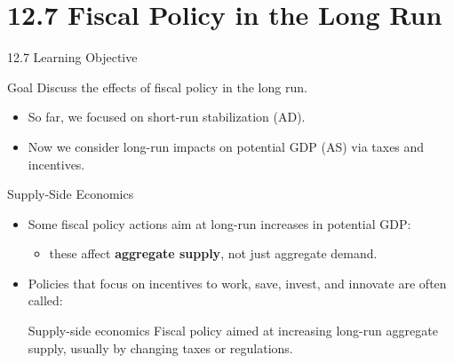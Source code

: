 \documentclass[aspectratio=169]{beamer}
\begin{document}
\section{12.7 Fiscal Policy in the Long Run}

\begin{frame}{12.7 Learning Objective}
\transfade
\begin{block}{Goal}
Discuss the effects of fiscal policy in the long run.
\end{block}
\begin{itemize}[<+->]
  \item So far, we focused on short-run stabilization (AD).
  \item Now we consider long-run impacts on potential GDP (AS) via taxes and incentives.
\end{itemize}
\end{frame}

\begin{frame}{Supply-Side Economics}
\transfade
\begin{itemize}[<+->]
  \item Some fiscal policy actions aim at long-run increases in potential GDP:
  \begin{itemize}[<+->]
    \item these affect \textbf{aggregate supply}, not just aggregate demand.
  \end{itemize}
  \item Policies that focus on incentives to work, save, invest, and innovate are often called:
  \begin{block}{Supply-side economics}
    Fiscal policy aimed at increasing long-run aggregate supply, usually by changing taxes or regulations.
  \end{block}
\end{itemize}
\end{frame}
\end{document}

